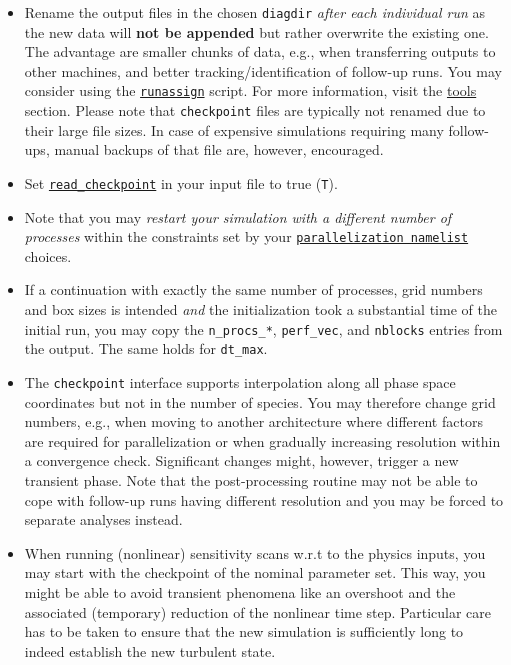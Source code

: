 \documentclass[12pt]{article}
\begin{document}
\begin{itemize}

 \item Rename the \gene output files in the chosen {\tt diagdir} {\em after each individual run}
 as the new data will {\bf not be appended} but rather overwrite the existing one.
 The advantage are smaller chunks of data, e.g., when transferring \gene outputs to
 other machines, and better tracking/identification of follow-up runs. You may consider using
 the \hyperlink{runassign}{\tt runassign} script. For more information,
 visit the \hyperref[sec:tools]{tools} section. Please note that {\tt checkpoint} files are
 typically not renamed due to their large file sizes.
 In case of expensive simulations requiring many follow-ups,
 manual backups of that file are, however, encouraged.

 \item Set \hyperlink{read_checkpoint}{\tt read\_checkpoint} in your \gene input file
 to true ({\tt T}).

 \item Note that you may {\em restart your simulation with a different number of processes}
 within the constraints set by your \hyperlink{parallelization_nml}{{\tt parallelization namelist}}
 choices.

 \item If a continuation with exactly the same number of processes, grid numbers
 and box sizes is intended {\em and} the initialization took a substantial time of the initial run,
 you may copy the {\tt n\_procs\_*}, {\tt perf\_vec}, and {\tt nblocks} entries from the output.
 The same holds for {\tt dt\_max}.

 \item The {\tt checkpoint} interface supports interpolation along all phase space coordinates but
 not in the number of species. You may therefore change grid numbers, e.g., when moving to another
 architecture where different factors are required for parallelization or when gradually increasing
 resolution within a convergence check. Significant changes might, however, trigger a new transient phase.
 Note that the post-processing routine may not be able to cope with follow-up runs having different
 resolution and you may be forced to separate analyses instead.

 \item When running (nonlinear) sensitivity scans w.r.t to the physics inputs, you may start with
 the checkpoint of the nominal parameter set. This way, you might be able to avoid transient phenomena
 like an overshoot and the associated (temporary) reduction of the nonlinear time step. Particular
 care has to be taken to ensure that the new simulation is sufficiently long to indeed establish the
 new turbulent state.


\end{itemize}
\end{document}
